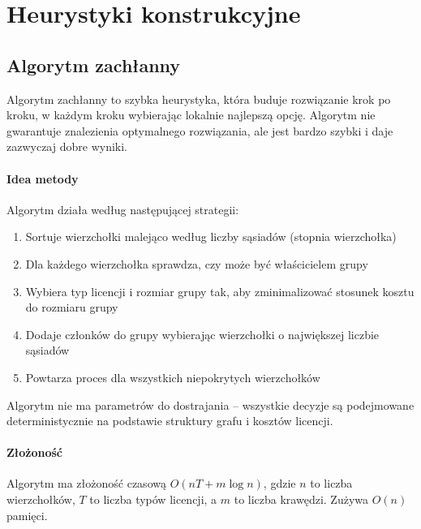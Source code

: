 \section{Heurystyki konstrukcyjne}

\subsection{Algorytm zachłanny}\label{subsec:greedy}

Algorytm zachłanny to szybka heurystyka, która buduje rozwiązanie krok po kroku, w każdym kroku wybierając lokalnie najlepszą opcję. Algorytm nie gwarantuje znalezienia optymalnego rozwiązania, ale jest bardzo szybki i daje zazwyczaj dobre wyniki.

\paragraph{Idea metody}
Algorytm działa według następującej strategii:
\begin{enumerate}
  \item Sortuje wierzchołki malejąco według liczby sąsiadów (stopnia wierzchołka)
  \item Dla każdego wierzchołka sprawdza, czy może być właścicielem grupy
  \item Wybiera typ licencji i rozmiar grupy tak, aby zminimalizować stosunek kosztu do rozmiaru grupy
  \item Dodaje członków do grupy wybierając wierzchołki o największej liczbie sąsiadów
  \item Powtarza proces dla wszystkich niepokrytych wierzchołków
\end{enumerate}

Algorytm nie ma parametrów do dostrajania -- wszystkie decyzje są podejmowane deterministycznie na podstawie struktury grafu i kosztów licencji.

\paragraph{Złożoność}
Algorytm ma złożoność czasową $O(nT + m\log n)$, gdzie $n$ to liczba wierzchołków, $T$ to liczba typów licencji, a $m$ to liczba krawędzi. Zużywa $O(n)$ pamięci.

